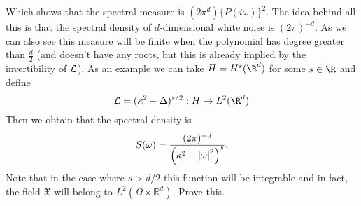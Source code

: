 \documentclass[12pt]{article}
\newcommand{\red}[1]{{\color{red}#1}}
\begin{document}
\begin{CJK*}{UTF8}{gbsn}
\begin{equation*}
	\end{equation*}
	Which shows that the spectral measure is $(2\pi^d)\{P(i\omega)\}^2$. The idea behind all this is that the spectral density of $d$-dimensional white noise is $(2\pi)^{-d}$. As we can also see this measure will be finite when the polynomial has degree greater than $\frac{d}{2}$
	(and doesn't have any roots, but this is already implied by the invertibility of $\mathcal{L}$). As an example we can take $H=H^s(\R^d)$  for some $s\in \R$ and define
	\begin{equation*}
		\Ll=(\kappa^2-\Delta)^{s/2}: H\to L^2(\R^d)
	\end{equation*}
	Then we obtain that the spectral density is
	\begin{equation*}
		S(\omega)=\frac{(2\pi)^{-d}}{\left(\kappa^2+\abs{\omega}^2\right)^s}.
	\end{equation*}
	Note that in the case where $s>d/2$ this function will be integrable and in fact, the field $\mathfrak{X}$ will  belong to $L^2(\Omega\times\mathbb{R}^d)$. \red{Prove this}.
\end{CJK*}




\end{document}
